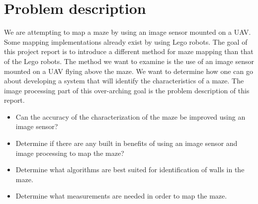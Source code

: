 \section*{Problem description}
We are attempting to map a maze by using an image sensor mounted on a UAV. Some mapping implementations already exist by using Lego robots. The goal of this project report is to introduce a different method for maze mapping than that of the Lego robots. The method we want to examine is the use of an image sensor mounted on a UAV flying above the maze. We want to determine how one can go about developing a system that will identify the characteristics of a maze. The image processing part of this over-arching goal is the problem description of this report.\\

\begin{itemize}
\item Can the accuracy of the characterization of the maze be improved using an image sensor?
\item Determine if there are any built in benefits of using an image sensor and image processing to map the maze?
\item Determine what algorithms are best suited for identification of walls in the maze.
\item Determine what measurements are needed in order to map the maze.
\end{itemize}
